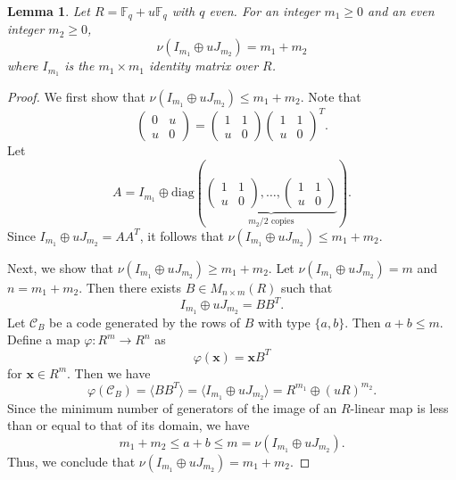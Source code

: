 \documentclass{article}
\newtheorem{lemma}[theorem]{Lemma}
\theoremstyle{definition}
\theoremstyle{remark}
\begin{document}
\begin{lemma}\label{nunonzerodiag}
    Let $R=\mathbb{F}_q+u\mathbb{F}_q$ with $q$ even. For an integer $m_1\ge 0$ and an even integer $m_2\ge 0$,
    \[
    \nu(I_{m_1}\oplus uJ_{m_2})=m_1+m_2
    \]
    where $I_{m_1}$ is the $m_1\times m_1$ identity matrix over $R$.
\end{lemma}
\begin{proof}
We first show that $\nu(I_{m_1}\oplus uJ_{m_2})\le m_1+m_2$. Note that
\[
\begin{pmatrix}
    0 & u\\u & 0
\end{pmatrix}=
\begin{pmatrix}
    1 & 1\\u & 0
\end{pmatrix}
\begin{pmatrix}
    1 & 1\\u & 0
\end{pmatrix}^T.
\]
Let
\[
A=I_{m_1}\oplus
\mathrm{diag}\left(
\underbrace{
\begin{pmatrix}
1&1\\
u&0
\end{pmatrix},
\ldots,
\begin{pmatrix}
1&1\\
u&0
\end{pmatrix}
}_{m_2/2\text{ copies}}
\right).
\]
Since $I_{m_1}\oplus uJ_{m_2}=AA^T$, it follows that $\nu(I_{m_1}\oplus uJ_{m_2})\le m_1+m_2$.

Next, we show that $\nu(I_{m_1}\oplus uJ_{m_2})\ge m_1+m_2$. Let $\nu(I_{m_1}\oplus uJ_{m_2})=m$ and $n=m_1+m_2$. Then there exists $B\in M_{n\times m}(R)$ such that
\[
I_{m_1}\oplus uJ_{m_2}=BB^T.
\]
Let $\mathcal{C}_B$ be a code generated by the rows of $B$ with type $\{a, b\}$. Then $a+b\le m$. Define a map $\varphi:R^{m}\to R^n$ as
\[
\varphi(\mathbf{x})=\mathbf{x}B^T
\]
for $\mathbf{x}\in R^m$. Then we have
\[
\varphi(\mathcal{C}_B)=\langle BB^T\rangle=\langle I_{m_1}\oplus uJ_{m_2}\rangle=R^{m_1}\oplus (uR)^{m_2}.
\]
Since the minimum number of generators of the image of an $R$-linear map is less than or equal to that of its domain, we have
\[
m_1+m_2\le a+b\le m=\nu(I_{m_1}\oplus uJ_{m_2}).
\]
Thus, we conclude that $\nu(I_{m_1}\oplus uJ_{m_2})=m_1+m_2$.
\end{proof}
\end{document}
